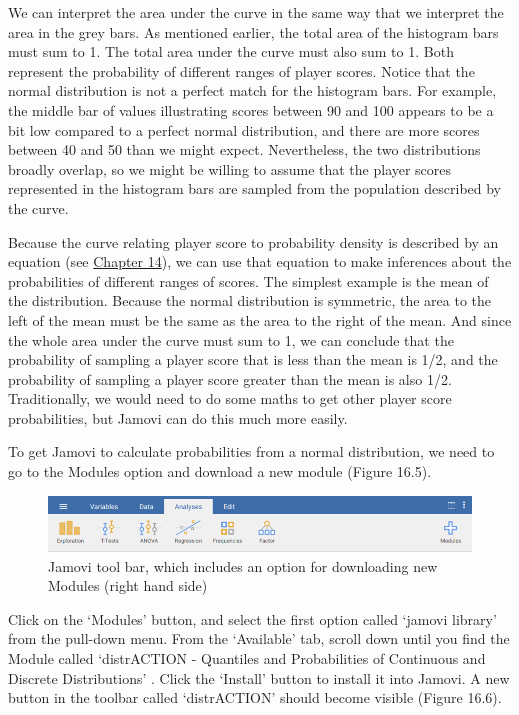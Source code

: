 \documentclass[
]{scrbook}
\begin{document}
We can interpret the area under the curve in the same way that we interpret the area in the grey bars.
As mentioned earlier, the total area of the histogram bars must sum to 1.
The total area under the curve must also sum to 1.
Both represent the probability of different ranges of player scores.
Notice that the normal distribution is not a perfect match for the histogram bars.
For example, the middle bar of values illustrating scores between 90 and 100 appears to be a bit low compared to a perfect normal distribution, and there are more scores between 40 and 50 than we might expect.
Nevertheless, the two distributions broadly overlap, so we might be willing to assume that the player scores represented in the histogram bars are sampled from the population described by the curve.

Because the curve relating player score to probability density is described by an equation (see \protect\hyperlink{Chapter_14}{Chapter 14}), we can use that equation to make inferences about the probabilities of different ranges of scores.
The simplest example is the mean of the distribution.
Because the normal distribution is symmetric, the area to the left of the mean must be the same as the area to the right of the mean.
And since the whole area under the curve must sum to 1, we can conclude that the probability of sampling a player score that is less than the mean is 1/2, and the probability of sampling a player score greater than the mean is also 1/2.
Traditionally, we would need to do some maths to get other player score probabilities, but Jamovi can do this much more easily.

To get Jamovi to calculate probabilities from a normal distribution, we need to go to the Modules option and download a new module (Figure 16.5).

\begin{figure}
\includegraphics[width=1\linewidth]{img/jamovi_toolbar_modules} \caption{Jamovi tool bar, which includes an option for downloading new Modules (right hand side)}\label{fig:unnamed-chunk-74}
\end{figure}

Click on the `Modules' button, and select the first option called `jamovi library' from the pull-down menu.
From the `Available' tab, scroll down until you find the Module called `distrACTION - Quantiles and Probabilities of Continuous and Discrete Distributions' \citep{Rihs2018}.
Click the `Install' button to install it into Jamovi.
A new button in the toolbar called `distrACTION' should become visible (Figure 16.6).
\end{document}
